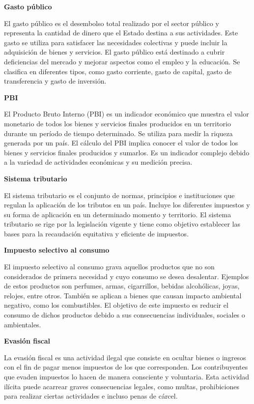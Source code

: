 \documentclass[
  jou,
  floatsintext,
  longtable,
  a4paper,
  nolmodern,
  notxfonts,
  notimes,
  12pt,
  colorlinks=true,linkcolor=blue,citecolor=blue,urlcolor=blue]{apa7}
\begin{document}
\textbf{Gasto público}

El gasto público es el desembolso total realizado por el sector público
y representa la cantidad de dinero que el Estado destina a sus
actividades. Este gasto se utiliza para satisfacer las necesidades
colectivas y puede incluir la adquisición de bienes y servicios. El
gasto público está destinado a cubrir deficiencias del mercado y mejorar
aspectos como el empleo y la educación. Se clasifica en diferentes
tipos, como gasto corriente, gasto de capital, gasto de transferencia y
gasto de inversión.

\textbf{PBI}

El Producto Bruto Interno (PBI) es un indicador económico que muestra el
valor monetario de todos los bienes y servicios finales producidos en un
territorio durante un período de tiempo determinado. Se utiliza para
medir la riqueza generada por un país. El cálculo del PBI implica
conocer el valor de todos los bienes y servicios finales producidos y
sumarlos. Es un indicador complejo debido a la variedad de actividades
económicas y su medición precisa.

\textbf{Sistema tributario}

El sistema tributario es el conjunto de normas, principios e
instituciones que regulan la aplicación de los tributos en un país.
Incluye los diferentes impuestos y su forma de aplicación en un
determinado momento y territorio. El sistema tributario se rige por la
legislación vigente y tiene como objetivo establecer las bases para la
recaudación equitativa y eficiente de impuestos.

\textbf{Impuesto selectivo al consumo}

El impuesto selectivo al consumo grava aquellos productos que no son
considerados de primera necesidad y cuyo consumo se desea desalentar.
Ejemplos de estos productos son perfumes, armas, cigarrillos, bebidas
alcohólicas, joyas, relojes, entre otros. También se aplican a bienes
que causan impacto ambiental negativo, como los combustibles. El
objetivo de este impuesto es reducir el consumo de dichos productos
debido a sus consecuencias individuales, sociales o ambientales.

\textbf{Evasión fiscal}

La evasión fiscal es una actividad ilegal que consiste en ocultar bienes
o ingresos con el fin de pagar menos impuestos de los que corresponden.
Los contribuyentes que evaden impuestos lo hacen de manera consciente y
voluntaria. Esta actividad ilícita puede acarrear graves consecuencias
legales, como multas, prohibiciones para realizar ciertas actividades e
incluso penas de cárcel.
\end{document}
